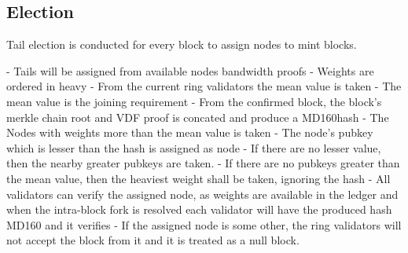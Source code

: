 \documentclass[../Bitcoin Blink.tex]{subfiles}
\begin{document}
\normalsize

\subsection{Election}

Tail election is conducted for every block to assign nodes to mint blocks.

- Tails will be assigned from available nodes bandwidth proofs
- Weights are ordered in heavy
- From the current ring validators the mean value is taken
- The mean value is the joining requirement
- From the confirmed block, the block's merkle chain root and VDF proof is concated and produce a MD160hash
- The Nodes with weights more than the mean value is taken
- The node's pubkey which is lesser than the hash is assigned as node
- If there are no lesser value, then the nearby greater pubkeys are taken.
- If there are no pubkeys greater than the mean value, then the heaviest weight shall be taken, ignoring the hash
- All validators can verify the assigned node, as weights are available in the ledger and when the intra-block fork is resolved each validator will have the produced hash MD160 and it verifies
- If the assigned node is some other, the ring validators will not accept the block from it and it is treated as a null block.
\end{document}
